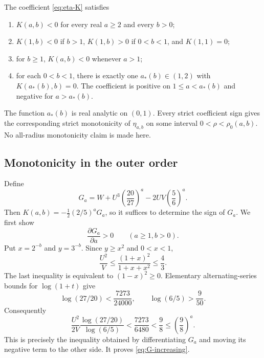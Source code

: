 \begin{theorem}
\label{thm:radius-local-sign}
The coefficient \eqref{eq:eta-K} satisfies
\begin{enumerate}
\item $K(a,b)<0$ for every real $a\ge2$ and every $b>0$;
\item $K(1,b)<0$ if $b>1$, $K(1,b)>0$ if $0<b<1$, and
      $K(1,1)=0$;
\item for $b\ge1$, $K(a,b)<0$ whenever $a>1$;
\item for each $0<b<1$, there is exactly one $a_*(b)\in(1,2)$
      with $K(a_*(b),b)=0$. The coefficient is positive on
      $1\le a<a_*(b)$ and negative for $a>a_*(b)$.
\end{enumerate}
The function $a_*(b)$ is real analytic on $(0,1)$. Every strict
coefficient sign gives the corresponding strict monotonicity of
$\eta_{a,b}$ on some interval $0<\rho<\rho_0(a,b)$. No all-radius
monotonicity claim is made here.
\end{theorem}

\subsection{Monotonicity in the outer order}
Define
\[
 G_a=W+U^3\left(\frac{20}{27}\right)^a
            -2UV\left(\frac56\right)^a.
\]
Then $K(a,b)=-\tfrac12(2/5)^aG_a$, so it suffices to determine
the sign of $G_a$. We first show
\begin{equation}\label{eq:G-increasing}
 \frac{\partial G_a}{\partial a}>0\qquad(a\ge1, b>0).
\end{equation}
Put $x=2^{-b}$ and $y=3^{-b}$. Since $y\ge x^2$ and $0<x<1$,
\[
 \frac{U^2}{V}\le\frac{(1+x)^2}{1+x+x^2}\le\frac43.
\]
The last inequality is equivalent to $(1-x)^2\ge0$.
Elementary alternating-series bounds for $\log(1+t)$ give
\[
 \log(27/20)<\frac{7273}{24000},\qquad
 \log(6/5)>\frac9{50}.
\]
Consequently
\[
 \frac{U^2}{2V}
       \frac{\log(27/20)}{\log(6/5)}
 <\frac{7273}{6480}<\frac98
 \le\left(\frac98\right)^a.
\]
This is precisely the inequality obtained by differentiating $G_a$
and moving its negative term to the other side. It proves
\eqref{eq:G-increasing}.

